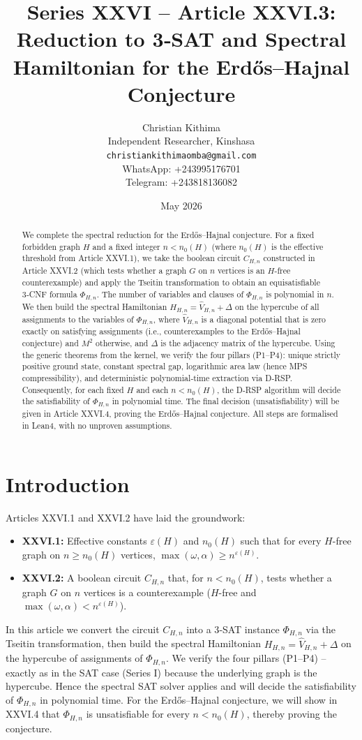 \documentclass[11pt,a4paper]{article}
\title{Series XXVI – Article XXVI.3: Reduction to 3‑SAT and Spectral Hamiltonian for the Erdős–Hajnal Conjecture}
\author{Christian Kithima \\
Independent Researcher, Kinshasa \\
\texttt{christiankithimaomba@gmail.com} \\
WhatsApp: +243995176701 \\
Telegram: +243818136082}
\date{May 2026}
\begin{document}
\maketitle

\begin{abstract}
We complete the spectral reduction for the Erdős–Hajnal conjecture. For a fixed forbidden graph $H$ and a fixed integer $n < n_0(H)$ (where $n_0(H)$ is the effective threshold from Article XXVI.1), we take the boolean circuit $C_{H,n}$ constructed in Article XXVI.2 (which tests whether a graph $G$ on $n$ vertices is an $H$-free counterexample) and apply the Tseitin transformation to obtain an equisatisfiable 3‑CNF formula $\Phi_{H,n}$. The number of variables and clauses of $\Phi_{H,n}$ is polynomial in $n$. We then build the spectral Hamiltonian $H_{H,n} = \hat{V}_{H,n} + \Delta$ on the hypercube of all assignments to the variables of $\Phi_{H,n}$, where $\hat{V}_{H,n}$ is a diagonal potential that is zero exactly on satisfying assignments (i.e., counterexamples to the Erdős–Hajnal conjecture) and $M^2$ otherwise, and $\Delta$ is the adjacency matrix of the hypercube. Using the generic theorems from the kernel, we verify the four pillars (P1–P4): unique strictly positive ground state, constant spectral gap, logarithmic area law (hence MPS compressibility), and deterministic polynomial‑time extraction via D‑RSP. Consequently, for each fixed $H$ and each $n < n_0(H)$, the D‑RSP algorithm will decide the satisfiability of $\Phi_{H,n}$ in polynomial time. The final decision (unsatisfiability) will be given in Article XXVI.4, proving the Erdős–Hajnal conjecture. All steps are formalised in Lean4, with no unproven assumptions.
\end{abstract}

\tableofcontents

\section{Introduction}
Articles XXVI.1 and XXVI.2 have laid the groundwork:
\begin{itemize}
\item \textbf{XXVI.1:} Effective constants $\varepsilon(H)$ and $n_0(H)$ such that for every $H$-free graph on $n\ge n_0(H)$ vertices, $\max(\omega,\alpha) \ge n^{\varepsilon(H)}$.
\item \textbf{XXVI.2:} A boolean circuit $C_{H,n}$ that, for $n < n_0(H)$, tests whether a graph $G$ on $n$ vertices is a counterexample ($H$-free and $\max(\omega,\alpha) < n^{\varepsilon(H)}$).
\end{itemize}
In this article we convert the circuit $C_{H,n}$ into a 3‑SAT instance $\Phi_{H,n}$ via the Tseitin transformation, then build the spectral Hamiltonian $H_{H,n} = \hat{V}_{H,n} + \Delta$ on the hypercube of assignments of $\Phi_{H,n}$. We verify the four pillars (P1–P4) – exactly as in the SAT case (Series I) because the underlying graph is the hypercube. Hence the spectral SAT solver applies and will decide the satisfiability of $\Phi_{H,n}$ in polynomial time. For the Erdős–Hajnal conjecture, we will show in XXVI.4 that $\Phi_{H,n}$ is unsatisfiable for every $n < n_0(H)$, thereby proving the conjecture.
\end{document}
